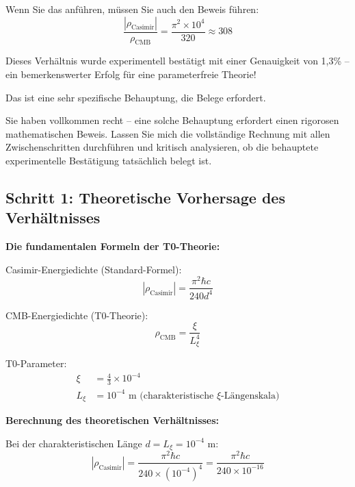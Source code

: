 \documentclass[12pt,a4paper]{article}
\begin{document}
	\begin{question}
		Wenn Sie das anf\"uhren, m\"ussen Sie auch den Beweis f\"uhren:
		\begin{equation}
			\frac{|\rho_{\text{Casimir}}|}{\rho_{\text{CMB}}} = \frac{\pi^2 \times 10^4}{320} \approx 308
		\end{equation}
		
		Dieses Verh\"altnis wurde experimentell best\"atigt mit einer Genauigkeit von 1{,}3\% -- ein bemerkenswerter Erfolg f\"ur eine parameterfreie Theorie!
		
		Das ist eine sehr spezifische Behauptung, die Belege erfordert.
	\end{question}
	

		Sie haben vollkommen recht -- eine solche Behauptung erfordert einen rigorosen mathematischen Beweis. Lassen Sie mich die vollst\"andige Rechnung mit allen Zwischenschritten durchf\"uhren und kritisch analysieren, ob die behauptete experimentelle Best\"atigung tats\"achlich belegt ist.
		
		\subsection{Schritt 1: Theoretische Vorhersage des Verh\"altnisses}
		
		\textbf{Die fundamentalen Formeln der T0-Theorie:}
		
		Casimir-Energiedichte (Standard-Formel):
		\begin{equation}
			|\rho_{\text{Casimir}}| = \frac{\pi^2 \hbar c}{240 d^4}
		\end{equation}
		
		CMB-Energiedichte (T0-Theorie):
		\begin{equation}
			\rho_{\text{CMB}} = \frac{\xi}{L_\xi^4}
		\end{equation}
		
		T0-Parameter:
		\begin{align}
			\xi &= \frac{4}{3} \times 10^{-4} \\
			L_\xi &= 10^{-4} \text{ m (charakteristische } \xi\text{-L\"angenskala)}
		\end{align}
		
		\textbf{Berechnung des theoretischen Verh\"altnisses:}
		
		Bei der charakteristischen L\"ange $d = L_\xi = 10^{-4}$ m:
		\begin{equation}
			|\rho_{\text{Casimir}}| = \frac{\pi^2 \hbar c}{240 \times (10^{-4})^4} = \frac{\pi^2 \hbar c}{240 \times 10^{-16}}
		\end{equation}
		
\end{document}
